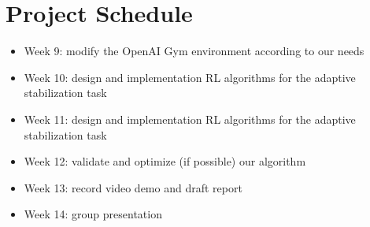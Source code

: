 \documentclass[10pt,a4paper]{article}
\begin{document}
\section{Project Schedule}
\begin{itemize}
	\item Week 9: modify the OpenAI Gym environment according to our needs
	\item Week 10: design and implementation RL algorithms for the adaptive stabilization task
	\item Week 11: design and implementation RL algorithms for the adaptive stabilization task
	\item Week 12: validate and optimize (if possible) our algorithm  
	\item Week 13: record video demo and draft report
	\item Week 14: group presentation
\end{itemize}
\end{document}
